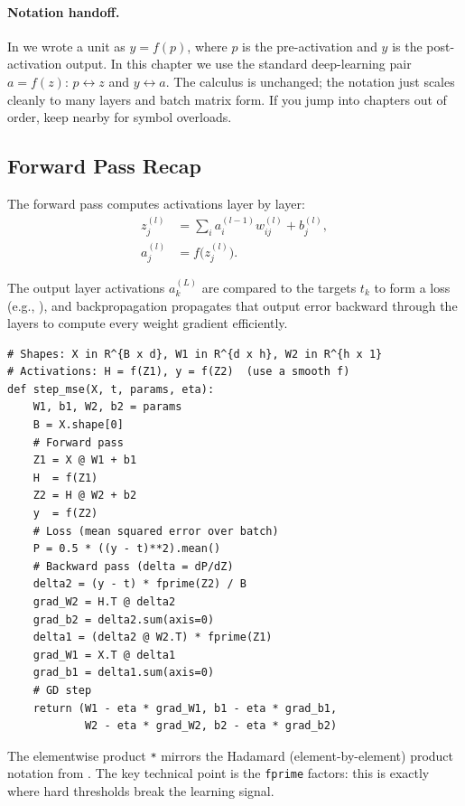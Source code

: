 \paragraph{Notation handoff.}
In  we wrote a unit as \(y=f(p)\), where \(p\) is the pre\hyp{}activation and \(y\) is the post\hyp{}activation output. In this chapter we use the standard deep-learning pair \(a=f(z)\): \(p \leftrightarrow z\) and \(y \leftrightarrow a\). The calculus is unchanged; the notation just scales cleanly to many layers and batch matrix form. If you jump into chapters out of order, keep  nearby for symbol overloads.

\subsection{Forward Pass Recap}
\label{sec:backprop_forward_pass_recap}

The forward pass computes activations layer by layer:
\begin{align*}
    z_j^{(l)} &= \sum_i a_i^{(l-1)} w_{ij}^{(l)} + b_j^{(l)}, \\
    a_j^{(l)} &= f\big(z_j^{(l)}\big).
\end{align*}

The output layer activations \(a_k^{(L)}\) are compared to the targets \(t_k\) to form a loss (e.g., ), and backpropagation propagates that output error backward through the layers to compute every weight gradient efficiently.

\begin{tcolorbox}[summarybox, title={Mini example (aligned with this chapter): mean squared error (MSE) backprop on a two-layer MLP}]
\footnotesize
\begin{verbatim}
# Shapes: X in R^{B x d}, W1 in R^{d x h}, W2 in R^{h x 1}
# Activations: H = f(Z1), y = f(Z2)  (use a smooth f)
def step_mse(X, t, params, eta):
    W1, b1, W2, b2 = params
    B = X.shape[0]
    # Forward pass
    Z1 = X @ W1 + b1
    H  = f(Z1)
    Z2 = H @ W2 + b2
    y  = f(Z2)
    # Loss (mean squared error over batch)
    P = 0.5 * ((y - t)**2).mean()
    # Backward pass (delta = dP/dZ)
    delta2 = (y - t) * fprime(Z2) / B
    grad_W2 = H.T @ delta2
    grad_b2 = delta2.sum(axis=0)
    delta1 = (delta2 @ W2.T) * fprime(Z1)
    grad_W1 = X.T @ delta1
    grad_b1 = delta1.sum(axis=0)
    # GD step
    return (W1 - eta * grad_W1, b1 - eta * grad_b1,
            W2 - eta * grad_W2, b2 - eta * grad_b2)
\end{verbatim}
\normalsize
The elementwise product \texttt{*} mirrors the Hadamard (element\hyp{}by\hyp{}element) product notation from . The key technical point is the \texttt{fprime} factors: this is exactly where hard thresholds break the learning signal.
\end{tcolorbox}

